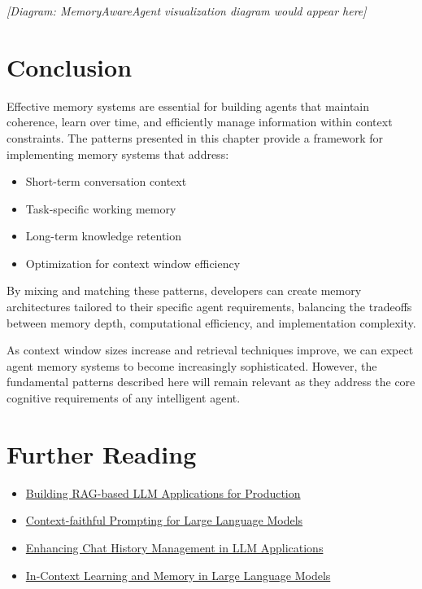 \documentclass[11pt,oneside]{book}
\providecommand{\tightlist}{%
  \setlength{\itemsep}{0pt}\setlength{\parskip}{0pt}}
\begin{document}
\emph{{[}Diagram: MemoryAwareAgent visualization diagram would appear
here{]}}

\section{Conclusion}\label{conclusion}

Effective memory systems are essential for building agents that maintain
coherence, learn over time, and efficiently manage information within
context constraints. The patterns presented in this chapter provide a
framework for implementing memory systems that address:

\begin{itemize}
\tightlist
\item
  Short-term conversation context
\item
  Task-specific working memory
\item
  Long-term knowledge retention
\item
  Optimization for context window efficiency
\end{itemize}

By mixing and matching these patterns, developers can create memory
architectures tailored to their specific agent requirements, balancing
the tradeoffs between memory depth, computational efficiency, and
implementation complexity.

As context window sizes increase and retrieval techniques improve, we
can expect agent memory systems to become increasingly sophisticated.
However, the fundamental patterns described here will remain relevant as
they address the core cognitive requirements of any intelligent agent.

\section{Further Reading}\label{further-reading}

\begin{itemize}
\tightlist
\item
  \href{https://arxiv.org/abs/2312.06648}{Building RAG-based LLM
  Applications for Production}
\item
  \href{https://arxiv.org/abs/2303.11315}{Context-faithful Prompting for
  Large Language Models}
\item
  \href{https://dx.doi.org/10.2139/ssrn.4602291}{Enhancing Chat History
  Management in LLM Applications}
\item
  \href{https://arxiv.org/abs/2211.05742}{In-Context Learning and Memory
  in Large Language Models}
\end{itemize}
\end{document}
